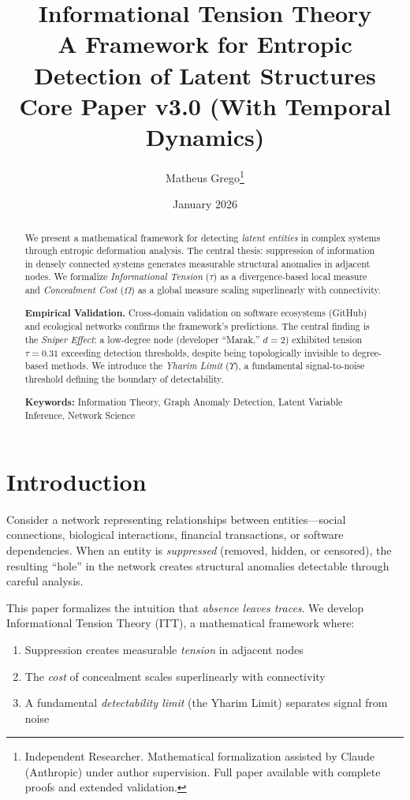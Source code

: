 \documentclass[11pt,a4paper]{article}
\title{
    \textbf{Informational Tension Theory} \\
    \Large A Framework for Entropic Detection of Latent Structures \\[0.5em]
    \normalsize Core Paper v3.0 (With Temporal Dynamics)
}
\author{
    Matheus Grego\footnote{Independent Researcher. Mathematical formalization assisted by Claude (Anthropic) under author supervision. Full paper available with complete proofs and extended validation.}
}
\date{January 2026}
\theoremstyle{definition}
\theoremstyle{remark}
\newcommand{\Yharim}{\Upsilon}
\begin{document}
\maketitle

\begin{abstract}
We present a mathematical framework for detecting \emph{latent entities} in complex systems through entropic deformation analysis. The central thesis: suppression of information in densely connected systems generates measurable structural anomalies in adjacent nodes. We formalize \emph{Informational Tension} ($\tau$) as a divergence-based local measure and \emph{Concealment Cost} ($\Omega$) as a global measure scaling superlinearly with connectivity. 

\textbf{Empirical Validation.} Cross-domain validation on software ecosystems (GitHub) and ecological networks confirms the framework's predictions. The central finding is the \emph{Sniper Effect}: a low-degree node (developer ``Marak,'' $d=2$) exhibited tension $\tau = 0.31$ exceeding detection thresholds, despite being topologically invisible to degree-based methods. We introduce the \emph{Yharim Limit} ($\Yharim$), a fundamental signal-to-noise threshold defining the boundary of detectability.

\vspace{0.5em}
\noindent\textbf{Keywords:} Information Theory, Graph Anomaly Detection, Latent Variable Inference, Network Science
\end{abstract}

\section{Introduction}

Consider a network representing relationships between entities---social connections, biological interactions, financial transactions, or software dependencies. When an entity is \emph{suppressed} (removed, hidden, or censored), the resulting ``hole'' in the network creates structural anomalies detectable through careful analysis.

This paper formalizes the intuition that \emph{absence leaves traces}. We develop Informational Tension Theory (ITT), a mathematical framework where:
\begin{enumerate}[noitemsep]
    \item Suppression creates measurable \emph{tension} in adjacent nodes
    \item The \emph{cost} of concealment scales superlinearly with connectivity
    \item A fundamental \emph{detectability limit} (the Yharim Limit) separates signal from noise
\end{enumerate}
\end{document}
